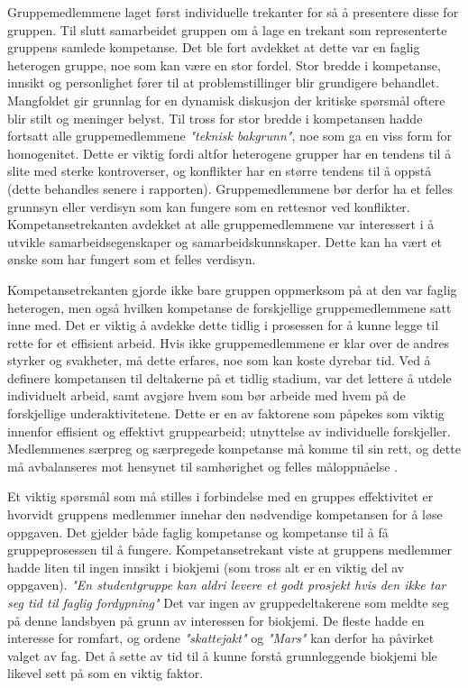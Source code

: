 Gruppemedlemmene laget først individuelle trekanter for så å presentere disse for gruppen.
Til slutt samarbeidet gruppen om å lage en trekant som representerte gruppens samlede kompetanse.
Det ble fort avdekket at dette var en faglig heterogen gruppe, noe som kan være en stor fordel.
Stor bredde i kompetanse, innsikt og personlighet fører til at problemstillinger blir grundigere behandlet.
Mangfoldet gir grunnlag for en dynamisk diskusjon der kritiske spørsmål oftere blir stilt og meninger belyst.
Til tross for stor bredde i kompetansen hadde fortsatt alle gruppemedlemmene \emph{"teknisk bakgrunn"}, noe som ga en viss form for homogenitet.
Dette er viktig fordi altfor heterogene grupper har en tendens til å slite med sterke kontroverser, og konflikter har en større tendens til å oppstå (dette behandles senere i rapporten).
Gruppemedlemmene bør derfor ha et felles grunnsyn eller verdisyn som kan fungere som en rettesnor ved konflikter.
Kompetansetrekanten avdekket at alle gruppemedlemmene var interessert i å utvikle samarbeidsegenskaper og samarbeidskunnskaper.
Dette kan ha vært et ønske som har fungert som et felles verdisyn. 

Kompetansetrekanten gjorde ikke bare gruppen oppmerksom på at den var faglig heterogen, men også hvilken kompetanse de forskjellige gruppemedlemmene satt inne med.
Det er viktig å avdekke dette tidlig i prosessen for å kunne legge til rette for et effisient arbeid.
Hvis ikke gruppemedlemmene er klar over de andres styrker og svakheter, må dette erfares, noe som kan koste dyrebar tid.
Ved å definere kompetansen til deltakerne på et tidlig stadium, var det lettere å utdele individuelt arbeid, samt avgjøre hvem som bør arbeide med hvem på de forskjellige underaktivitetene.
Dette er en av faktorene som påpekes som viktig innenfor effisient og effektivt gruppearbeid; utnyttelse av individuelle forskjeller.
Medlemmenes særpreg og særpregede kompetanse må komme til sin rett, og dette må avbalanseres mot hensynet til samhørighet og felles måloppnåelse \cite{orgorg}. 

Et viktig spørsmål som må stilles i forbindelse med en gruppes effektivitet er hvorvidt gruppens medlemmer innehar den nødvendige kompetansen for å løse oppgaven.
Det gjelder både faglig kompetanse og kompetanse til å få gruppeprosessen til å fungere.
Kompetansetrekant viste at gruppens medlemmer hadde liten til ingen innsikt i biokjemi (som tross alt er en viktig del av oppgaven).
\textit{"En studentgruppe kan aldri levere et godt prosjekt hvis den ikke tar seg tid til faglig fordypning"} \cite{orgorg}
Det var ingen av gruppedeltakerene som meldte seg på denne landsbyen på grunn av interessen for biokjemi.
De fleste hadde en interesse for romfart, og ordene \emph{"skattejakt"} og \emph{"Mars"} kan derfor ha påvirket valget av fag.
Det å sette av tid til å kunne forstå grunnleggende biokjemi ble likevel sett på som en viktig faktor.

